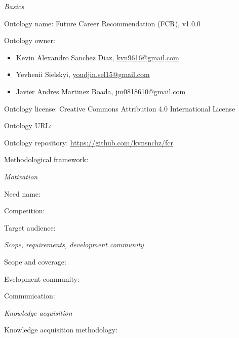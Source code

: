 \documentclass[english]{article}
\begin{document}
\begin{labelist}
    \item 
        \textit{Basics}
        \begin{labelist}
            \item Ontology name: Future Career Recommendation (FCR), v1.0.0
            \item Ontology owner:
                \begin{itemize}
                    \item Kevin Alexandro Sanchez Diaz, \href{mailto:kvn9616@gmail.com}{kvn9616@gmail.com}
                    \item Yevhenii Sielskyi, \href{mailto:youdjin.sel15@gmail.com}{youdjin.sel15@gmail.com}
                    \item Javier Andres Martinez Boada, \href{mailto:jm0818610@gmail.com}{jm0818610@gmail.com}
                \end{itemize}
            \item Ontology license: Creative Commons Attribution 4.0 International License
            \item Ontology URL: 
            \item Ontology repository: \href{https://github.com/kvnsnchz/fcr}{https://github.com/kvnsnchz/fcr}
            \item Methodological framework:
        \end{labelist}
    \item 
        \textit{Motivation}
        \begin{labelist}
            \item Need name:
            \item Competition:
            \item Target audience:
        \end{labelist}
    \item 
        \textit{Scope, requirements, development community}
        \begin{labelist}
            \item Scope and coverage:
            \item Evelopment community:
            \item Communication:
        \end{labelist}
    \item 
        \textit{Knowledge acquisition}
        \begin{labelist}
            \item Knowledge acquisition methodology:

\end{labelist}
\end{labelist}
\end{document}
